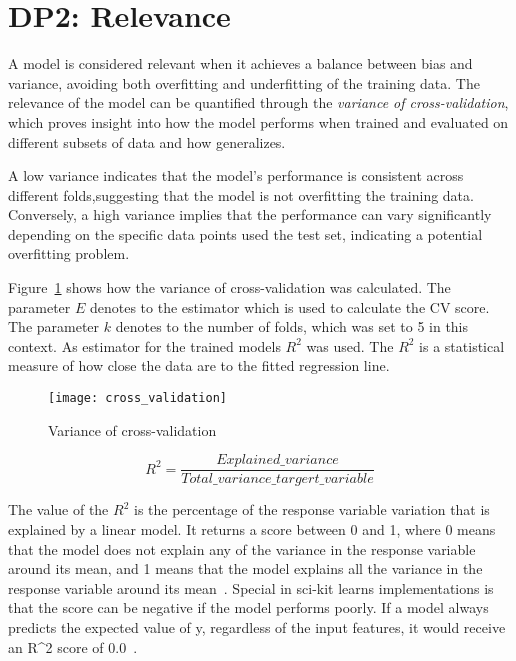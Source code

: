 \section{DP2: Relevance}\label{sec:relevance}

A model is considered relevant when it achieves a balance between bias and
variance, avoiding both overfitting and underfitting of the training data.
The relevance of the model can be quantified through the \textit{variance of
cross-validation}, which proves insight into how the model performs when trained and
evaluated on different subsets of data and how generalizes.

A low variance indicates that the model's performance is consistent across
different folds,suggesting that the model is not overfitting the training data.
Conversely, a high variance implies that the performance can vary significantly
depending on the specific data points used the test set, indicating a potential
overfitting problem.

Figure~\ref{fig:variance-of-cv} shows how the variance of cross-validation
was calculated.
The parameter \(E\) denotes to the estimator which is used to calculate the
\ac{CV} score.
The parameter \(k\) denotes to the number of folds, which was set to 5 in this
context.
As estimator for the trained models \(R^2\) was used.
The \(R^2\) is a statistical measure of how close the data are to the fitted regression
line.

\begin{figure}[h]
    \begin{tcolorbox}[arc=0pt,boxrule=0.5pt]
        \centering
        \texttt{[image: cross\_validation]}
        \caption{Variance of cross-validation}
        \label{fig:variance-of-cv}
    \end{tcolorbox}
\end{figure}

\begin{equation}
    \label{eq:r2}
    R^2 = \frac{Explained\_variance}{Total\_variance\_targert\_variable}
\end{equation}

The value of the \(R^2\) is the percentage of the response variable variation that is
explained by a linear model.
It returns a score between 0 and 1, where 0 means that the model does not
explain any of the variance in the response variable around its mean, and 1 means that
the model explains all the variance in the response variable around its mean~\cite[p.
43]{muller_introductionmachinelearning_2016}.
Special in sci-kit learns implementations is that the score can be negative if the model
performs poorly. If a model always predicts the expected value of y, regardless of the
input features, it would receive an R^2 score of 0.0~\cite{_sklearnmetricsr2_}.


